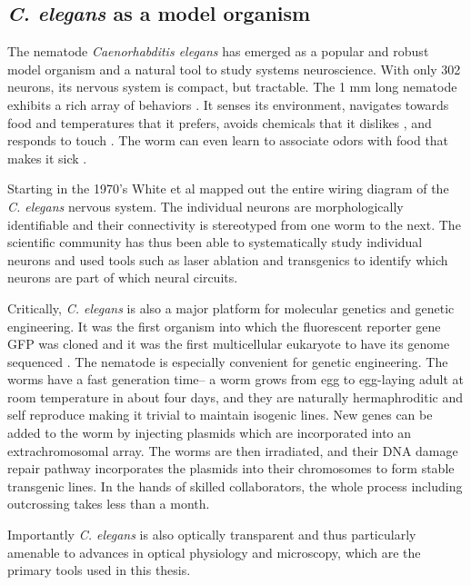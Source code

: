 \subsection{\textit{C. elegans} as a model organism}
The nematode \textit{Caenorhabditis elegans} has emerged as a popular and robust model organism and a natural tool to study systems neuroscience. With only 302 neurons, its nervous system is compact, but tractable. The 1 mm long nematode exhibits a rich array of behaviors \citep{croll_components_1975}. It senses its environment,  navigates towards  food \cite{grewal_migration_1992}  and temperatures \cite{ryu_thermotaxis_2002} that it prefers,  avoids chemicals that it dislikes \citep{croll_behavoural_1975}, and responds to touch \citep{chalfie_neural_1985}. The worm can even learn to associate odors with food that makes it sick \citep{zhang_pathogenic_2005}. 

Starting in the 1970's White et al \citep{white_structure_1976, white_structure_1986}  mapped out the entire wiring diagram of the \textit{C. elegans} nervous system. The individual neurons are morphologically identifiable and their connectivity is stereotyped from one worm to the next. The  scientific community has thus been able to systematically study individual neurons and  used tools such as laser ablation and transgenics to identify which neurons are part of which neural circuits. 

Critically, \textit{C. elegans} is also a major platform for molecular genetics and genetic engineering. It was the first organism into which the fluorescent reporter gene GFP was cloned \citep{chalfie_green_1994}  and it was the first multicellular eukaryote to have its genome sequenced \citep{sulston_c._1992,_genome_1998}. The nematode is especially convenient for genetic engineering. The worms have a fast generation time-- a worm grows from egg to egg-laying adult at room temperature in about four days,  and they are naturally hermaphroditic and self reproduce  making it trivial to maintain isogenic lines. New genes can be added to the worm by injecting plasmids which are incorporated into an extrachromosomal array. The worms are then irradiated, and their DNA damage repair pathway incorporates the plasmids into their chromosomes to form stable transgenic lines.  In the hands of skilled collaborators, the whole process including outcrossing takes less than a month. 

Importantly \textit{C. elegans} is also optically transparent and thus particularly amenable to advances in optical physiology and microscopy, which are the primary tools used in this thesis. 

